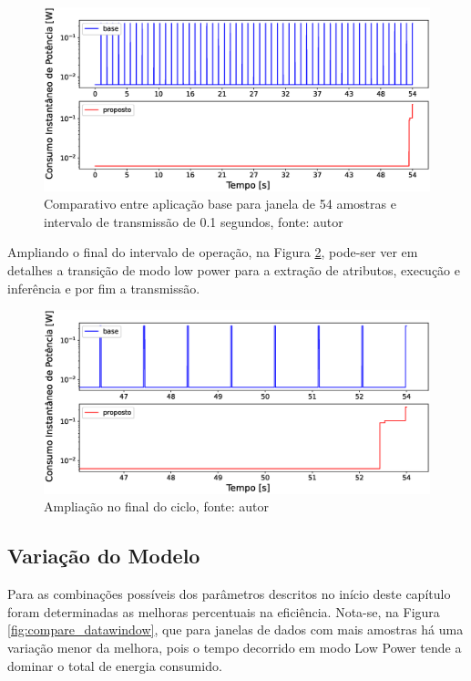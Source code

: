 \documentclass[a5paper]{ufsc-thesis}  %
\begin{document}
\begin{figure}[!ht]
    \centering
    \includegraphics[width=1\linewidth]{imagens/compare_cycles.eps}
    \caption{Comparativo entre aplicação base para janela de 54 amostras e intervalo de transmissão de 0.1 segundos, fonte: autor}
    \label{fig:compare_cycles}
\end{figure}

Ampliando o final do intervalo de operação, na Figura \ref{fig:compare_cycles_zoom}, pode-ser ver em detalhes a transição de modo low power para a extração de atributos, execução e inferência e por fim a transmissão.

\begin{figure}[!ht]
    \centering
    \includegraphics[width=1\linewidth]{imagens/compare_cycles_zoom.eps}
    \caption{Ampliação no final do ciclo, fonte: autor}
    \label{fig:compare_cycles_zoom}
\end{figure}

\subsection{Variação do Modelo}
Para as combinações possíveis dos parâmetros descritos no início deste capítulo foram determinadas as melhoras percentuais na eficiência. Nota-se, na Figura \ref{fig:compare_datawindow}, que para janelas de dados com mais amostras há uma variação menor da melhora, pois o tempo decorrido em modo Low Power tende a dominar o total de energia consumido.
\end{document}
